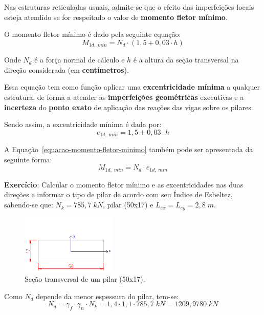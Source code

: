 Nas estruturas reticuladas usuais, admite-se que o efeito das imperfeições locais esteja atendido se for respeitado o valor de \textbf{momento fletor mínimo}.

O momento fletor mínimo é dado pela seguinte equação:
\begin{equation}
	\label{equacao-momento-fletor-minimo}
	M_{1d,\;min}=N_d\cdot(1,5+0,03\cdot h)
\end{equation}

Onde $N_d$ é a força normal de cálculo e $h$ é a altura da seção transversal na direção considerada (em \textbf{centímetros}).

Essa equação tem como função aplicar uma \textbf{excentricidade mínima} a qualquer estrutura, de forma a atender as \textbf{imperfeições geométricas} executivas e a \textbf{incerteza} do \textbf{ponto exato} de aplicação das reações das vigas sobre os pilares.

Sendo assim, a excentricidade mínima é dada por:
\begin{equation}e_{1d,\;min}=1,5+0,03\cdot h\end{equation}

A Equação~\eqref{equacao-momento-fletor-minimo} também pode ser apresentada da seguinte forma:
\begin{equation}M_{1d,\;min}=N_d\cdot e_{1d,\;min}\end{equation}

\textbf{Exercício}: Calcular o momento fletor mínimo e as excentricidades nas duas direções e informar o tipo de pilar de acordo com seu Índice de Esbeltez, sabendo-se que: $N_k=785,7\;kN$, pilar (50x17) e $L_{ex}=L_{ey}=2,8\;m$.

\begin{figure}[H]
	\begin{center}
	\caption{Seção transversal de um pilar (50x17).}
    	\includegraphics[width=0.4\textwidth]{Momento-fletor-minimo/Imagens/Secao-transversal-pilar-50x17.png}
	\end{center}
\end{figure}

Como $N_d$ depende da menor espessura do pilar, tem-se:
$$N_d=\gamma_f\cdot\gamma_n\cdot N_k=1,4\cdot1,1\cdot785,7\;kN=1209,9780\;kN$$

